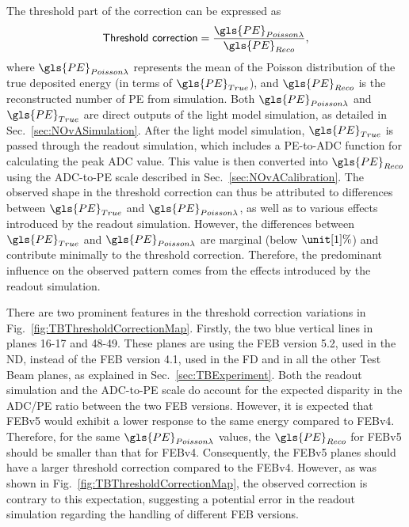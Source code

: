 The threshold part of the correction can be expressed as
\begin{equation}
\textsf{Threshold correction}=\frac{\gls{PE}_{Poisson \lambda}}{\gls{PE}_{Reco}},
\end{equation}
where $\gls{PE}_{Poisson \lambda}$ represents the mean of the Poisson distribution of the true deposited energy (in terms of $\gls{PE}_{True}$), and $\gls{PE}_{Reco}$ is the reconstructed number of \gls{PE} from simulation. Both $\gls{PE}_{Poisson \lambda}$ and $\gls{PE}_{True}$ are direct outputs of the light model simulation, as detailed in Sec.~\ref{sec:NOvASimulation}. After the light model simulation, $\gls{PE}_{True}$ is passed through the readout simulation, which includes a \gls{PE}-to-\gls{ADC} function for calculating the peak \gls{ADC} value. This value is then converted into $\gls{PE}_{Reco}$ using the \gls{ADC}-to-\gls{PE} scale described in Sec.~\ref{sec:NOvACalibration}. The observed shape in the threshold correction can thus be attributed to differences between $\gls{PE}_{True}$ and $\gls{PE}_{Poisson \lambda}$, as well as to various effects introduced by the readout simulation. However, the differences between $\gls{PE}_{True}$ and $\gls{PE}_{Poisson \lambda}$ are marginal (below $\unit[1]{\%}$) and contribute minimally to the threshold correction. Therefore, the predominant influence on the observed pattern comes from the effects introduced by the readout simulation.

There are two prominent features in the threshold correction variations in Fig.~\ref{fig:TBThresholdCorrectionMap}. Firstly, the two blue vertical lines in planes 16-17 and 48-49. These planes are using the \gls{FEB} version 5.2, used in the \gls{ND}, instead of  the \gls{FEB} version 4.1, used in the \gls{FD} and in all the other Test Beam planes, as explained in Sec.~\ref{sec:TBExperiment}. Both the readout simulation and the \gls{ADC}-to-\gls{PE} scale do account for the expected disparity in the \gls{ADC}/\gls{PE} ratio between the two \gls{FEB} versions. However, it is expected that \gls{FEB}v5 would exhibit a lower response to the same energy compared to \gls{FEB}v4. Therefore, for the same $\gls{PE}_{Poisson \lambda}$ values, the $\gls{PE}_{Reco}$ for \gls{FEB}v5 should be smaller than that for \gls{FEB}v4. Consequently, the \gls{FEB}v5 planes should have a larger threshold correction compared to the \gls{FEB}v4. However, as was shown in Fig.~\ref{fig:TBThresholdCorrectionMap}, the observed correction is contrary to this expectation, suggesting a potential error in the readout simulation regarding the handling of different \gls{FEB} versions.

